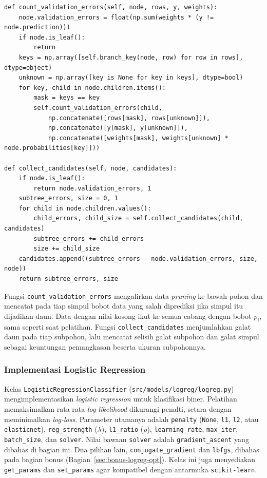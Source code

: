 \begin{lstlisting}
def count_validation_errors(self, node, rows, y, weights):
    node.validation_errors = float(np.sum(weights * (y != node.prediction)))
    if node.is_leaf():
        return
    keys = np.array([self.branch_key(node, row) for row in rows], dtype=object)
    unknown = np.array([key is None for key in keys], dtype=bool)
    for key, child in node.children.items():
        mask = keys == key
        self.count_validation_errors(child,
            np.concatenate([rows[mask], rows[unknown]]),
            np.concatenate([y[mask], y[unknown]]),
            np.concatenate([weights[mask], weights[unknown] * node.probabilities[key]]))

def collect_candidates(self, node, candidates):
    if node.is_leaf():
        return node.validation_errors, 1
    subtree_errors, size = 0, 1
    for child in node.children.values():
        child_errors, child_size = self.collect_candidates(child, candidates)
        subtree_errors += child_errors
        size += child_size
    candidates.append((subtree_errors - node.validation_errors, size, node))
    return subtree_errors, size
\end{lstlisting}

Fungsi \texttt{count\_validation\_errors} mengalirkan data \textit{pruning} ke
bawah pohon dan mencatat pada tiap simpul bobot data yang salah diprediksi jika
simpul itu dijadikan daun. Data dengan nilai kosong ikut ke semua cabang dengan
bobot $p_i$, sama seperti saat pelatihan. Fungsi \texttt{collect\_candidates}
menjumlahkan galat daun pada tiap subpohon, lalu mencatat selisih galat subpohon
dan galat simpul sebagai keuntungan pemangkasan beserta ukuran subpohonnya.

\subsubsection{Implementasi Logistic Regression}

Kelas \texttt{LogisticRegressionClassifier}
(\texttt{src/models/logreg/logreg.py}) mengimplementasikan \textit{logistic
regression} untuk klasifikasi biner. Pelatihan memaksimalkan rata-rata
\textit{log-likelihood} dikurangi penalti, setara dengan meminimalkan
\textit{log-loss}. Parameter utamanya adalah
\texttt{penalty} (\texttt{None}, \texttt{l1}, \texttt{l2}, atau
\texttt{elastic\allowbreak net}), \texttt{reg\_strength} ($\lambda$),
\texttt{l1\_ratio} ($\rho$), \texttt{learning\_rate}, \texttt{max\_iter},
\texttt{batch\_size}, dan \texttt{solver}. Nilai bawaan \texttt{solver} adalah
\texttt{gradient\_ascent} yang dibahas di bagian ini. Dua pilihan lain,
\texttt{conjugate\_gradient} dan \texttt{lbfgs}, dibahas pada bagian bonus
(Bagian~\ref{sec:bonus-logreg-opt}). Kelas ini juga menyediakan
\texttt{get\_params} dan \texttt{set\_params} agar kompatibel dengan antarmuka
\texttt{scikit-learn}.

